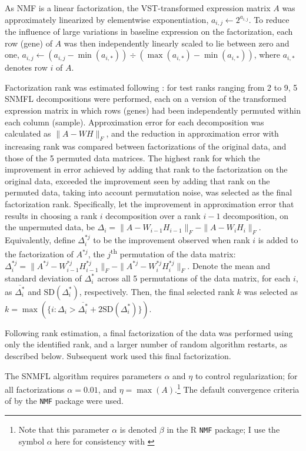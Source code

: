 \documentclass[dissertation.tex]{subfiles}
\begin{document}
As \gls{NMF} is a linear factorization, the \gls{VST}-transformed expression matrix $A$ was approximately linearized by elementwise exponentiation, $a_{i,j} \leftarrow 2^{a_{i,j}}$.  To reduce the influence of large variations in baseline expression on the factorization, each row (gene) of $A$ was then independently linearly scaled to lie between zero and one, $a_{i,j} \leftarrow (a_{i,j} - \min(a_{i,*})) \div (\max(a_{i,*}) - \min(a_{i,*}))$, where $a_{i,*}$ denotes row $i$ of $A$.

Factorization rank was estimated following \cite{Frigyesi2008}: for test ranks ranging from 2 to 9, 5 \gls{SNMFL} decompositions were performed, each on a version of the transformed expression matrix in which rows (genes) had been independently permuted within each column (sample).  Approximation error for each decomposition was calculated as $\|A - W H\|_F$, and the reduction in approximation error with increasing rank was compared between factorizations of the original data, and those of the 5 permuted data matrices.  The highest rank for which the improvement in error achieved by adding that rank to the factorization on the original data, exceeded the improvement seen by adding that rank on the permuted data, taking into account permutation noise, was selected as the final factorization rank.  Specifically, let the improvement in approximation error that results in choosing a rank $i$ decomposition over a rank $i-1$ decomposition, on the unpermuted data, be $\Delta_i = \|A - W_{i-1} H_{i-1}\|_F - \|A - W_{i} H_{i}\|_F$.  Equivalently, define $\Delta^{*j}_i$ to be the improvement observed when rank $i$ is added to the factorization of $A^{*j}$, the $j$\textsuperscript{th} permutation of the data matrix: $\Delta^{*j}_i = \|A^{*j} - W^{*j}_{i-1} H^{*j}_{i-1}\|_F - \|A^{*j} - W^{*j}_{i} H^{*j}_{i}\|_F$.  Denote the mean and standard deviation of $\Delta^{*}_i$ across all 5 permutations of the data matrix, for each $i$, as $\overline{\Delta^{*}_i}$ and $\text{SD}(\Delta^{*}_i)$, respectively.  Then, the final selected rank $k$ was selected as $k = \max(\{i : \Delta_i > \overline{\Delta^{*}_i} + 2 \text{SD}(\Delta^{*}_i)\})$.

Following rank estimation, a final factorization of the data was performed using only the identified rank, and a larger number of random algorithm restarts, as described below.  Subsequent work used this final factorization.

The \gls{SNMFL} algorithm requires parameters $\alpha$ and $\eta$ to control regularization; for all factorizations $\alpha = 0.01$, and $\eta = \max(A)$.\footnote{Note that this parameter $\alpha$ is denoted $\beta$ in the R \texttt{NMF} package; I use the symbol $\alpha$ here for consistency with \cite{Kim2007}}  The default convergence criteria of by the \texttt{NMF} package were used.
\end{document}
